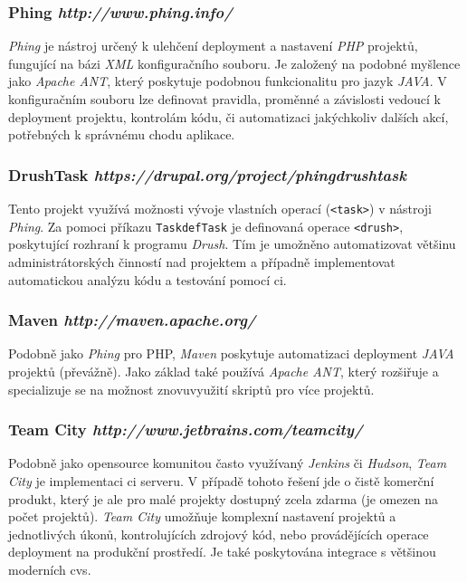 \subsubsection*{\textbf{Phing} \hfill \emph{http://www.phing.info/}}
\label{subsec:phing}
\emph{Phing} je nástroj určený k ulehčení \gls{deployment} a nastavení \emph{PHP} projektů, fungující na bázi \emph{XML} konfiguračního souboru. Je založený na podobné myšlence jako \emph{Apache ANT}, který poskytuje podobnou funkcionalitu pro jazyk \emph{JAVA}. V konfiguračním souboru lze definovat pravidla, proměnné a závislosti vedoucí k \gls{deployment} projektu, kontrolám kódu, či automatizaci jakýchkoliv dalších akcí, potřebných k správnému chodu aplikace.

\subsubsection*{\textbf{DrushTask} \hfill \emph{https://drupal.org/project/phingdrushtask}}
Tento projekt využívá možnosti vývoje vlastních operací (\texttt{<task>}) v nástroji \emph{Phing}. Za pomoci příkazu \texttt{TaskdefTask}\cite{website:phing-user-guide} je definovaná operace \texttt{<drush>}, poskytující rozhraní k programu \emph{Drush}. Tím je umožněno automatizovat většinu administrátorských činností nad projektem a případně implementovat automatickou analýzu kódu a testování pomocí \gls{ci}.

\subsubsection*{\textbf{Maven} \hfill \emph{http://maven.apache.org/}}
Podobně jako \emph{Phing} pro {PHP}, \emph{Maven} poskytuje automatizaci \gls{deployment} \emph{JAVA} projektů (převážně). Jako základ také používá \emph{Apache ANT}, který rozšiřuje a specializuje se na možnost znovuvyužití skriptů pro více projektů. 

\subsubsection*{\textbf{Team City} \hfill \emph{http://www.jetbrains.com/teamcity/}}
Podobně jako \gls{opensource} komunitou často využívaný \emph{Jenkins} či \emph{Hudson}, \emph{Team City} je implementaci \gls{ci} serveru. V případě tohoto řešení jde o čistě komerční produkt, který je ale pro malé projekty dostupný zcela zdarma (je omezen na počet projektů). \emph{Team City} umožňuje komplexní nastavení projektů a jednotlivých úkonů, kontrolujících zdrojový kód, nebo provádějících operace \gls{deployment} na produkční prostředí. Je také poskytována integrace s většinou moderních \gls{cvs}.

